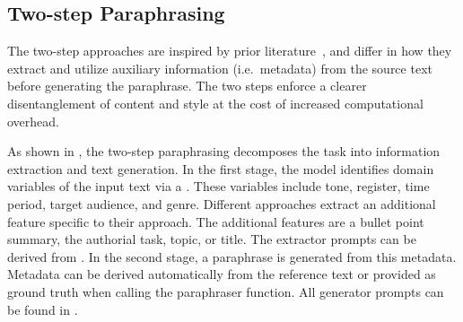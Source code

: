 \subsection{Two-step Paraphrasing}

The two-step approaches are inspired by prior literature~\citep{bevendorff_overview_2024, ayele_overview_2024}, and differ in how they extract and utilize auxiliary information (i.e.\ metadata) from the source text before generating the paraphrase. 
The two steps enforce a clearer disentanglement of content and style at the cost of increased computational overhead.

As shown in , the two-step paraphrasing decomposes the task into information extraction and text generation. 
In the first stage, the model identifies domain variables of the input text via a \pextractor{}.
These variables include tone, register, time period, target audience, and genre.
Different approaches extract an additional feature specific to their approach.
The additional features are a bullet point summary, the authorial task, topic, or title. 
The extractor prompts can be derived from .
In the second stage, a paraphrase is generated from this metadata. 
Metadata can be derived automatically from the reference text or provided as ground truth when calling the paraphraser function.
All generator prompts can be found in .

